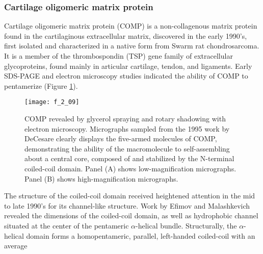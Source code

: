 \begin{refsection}
\subsubsection{Cartilage oligomeric matrix protein}
\label{sec:comp}

Cartilage oligomeric matrix protein (COMP) is a non-collagenous matrix protein
found in the cartilaginous extracellular matrix, discovered in the early 1990's,
first isolated and characterized in a native form from Swarm rat
chondrosarcoma.\cite{Morgelin1992} It is a member of the thrombospondin (TSP)
gene family of extracellular glycoproteins, found mainly in articular cartilage,
tendon, and
ligaments.\cite{Adams2001,Smith1997,Muller1998,Hedbom1992,Oldberg1992} Early
SDS-PAGE and electron microscopy studies indicated the ability of COMP to
pentamerize (Figure \ref{fig:COMP_EM_1}).\cite{DiCesare1995,Morgelin1992} 
\begin{figure}[h!] \centering \texttt{[image: f\_2\_09]}
    \caption[COMP revealed by glycerol spraying and rotary
        shadowing with electron microscopy. Micrographs sampled from the 1995
        work by DeCesare  clearly displays the five-armed
        molecules of COMP, demonstrating the ability of the macromolecule to
        self-assembling about a central core, composed of and stabilized by the
        N-terminal coiled-coil domain. Panel (A) shows low-magnification
    micrographs. Panel (B) shows high-magnification micrographs.]{COMP revealed by glycerol spraying and rotary
        shadowing with electron microscopy. Micrographs sampled from the 1995
        work by DeCesare  clearly displays the five-armed
        molecules of COMP, demonstrating the ability of the macromolecule to
        self-assembling about a central core, composed of and stabilized by the
        N-terminal coiled-coil domain. Panel (A) shows low-magnification
    micrographs. Panel (B) shows high-magnification micrographs.\cite{DiCesare1995}}\label{fig:COMP_EM_1} \end{figure}
The structure of the coiled-coil domain received heightened attention in the mid
to late 1990's for its channel-like structure. Work by Efimov and Malashkevich
revealed the dimensions of the coiled-coil domain, as well as hydrophobic
channel situated at the center of the pentameric ${\alpha}$-helical
bundle.\cite{Efimov1996,Malashkevich1996a} Structurally, the ${\alpha}$-helical
domain forms a homopentameric, parallel, left-handed coiled-coil with an average

\end{refsection}
